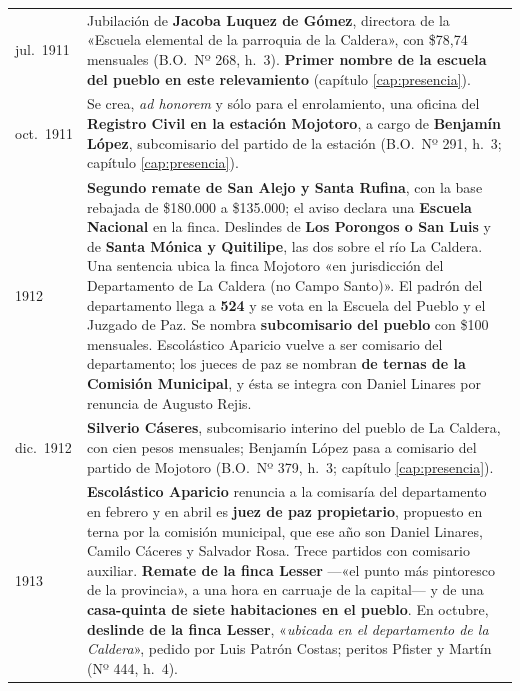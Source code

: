 \begin{longtable}{@{}p{2.7cm}p{10.3cm}@{}}
jul.\ 1911 & Jubilación de \textbf{Jacoba Luquez de Gómez}, directora de la «Escuela elemental de la parroquia de la Caldera», con \$78,74 mensuales (B.O.\ Nº 268, h.\ 3). \textbf{Primer nombre de la escuela del pueblo en este relevamiento} (capítulo \ref{cap:presencia}). \\
oct.\ 1911 & Se crea, \textit{ad honorem} y sólo para el enrolamiento, una oficina del \textbf{Registro Civil en la estación Mojotoro}, a cargo de \textbf{Benjamín López}, subcomisario del partido de la estación (B.O.\ Nº 291, h.\ 3; capítulo \ref{cap:presencia}). \\
1912 & \textbf{Segundo remate de San Alejo y Santa Rufina}, con la base rebajada de \$180.000 a \$135.000; el aviso declara una \textbf{Escuela Nacional} en la finca. Deslindes de \textbf{Los Porongos o San Luis} y de \textbf{Santa Mónica y Quitilipe}, las dos sobre el río La Caldera. Una sentencia ubica la finca Mojotoro «en jurisdicción del Departamento de La Caldera (no Campo Santo)». El padrón del departamento llega a \textbf{524} y se vota en la Escuela del Pueblo y el Juzgado de Paz. Se nombra \textbf{subcomisario del pueblo} con \$100 mensuales. Escolástico Aparicio\index{Aparicio, Escolástico M.} vuelve a ser comisario del departamento; los jueces de paz se nombran \textbf{de ternas de la Comisión Municipal}, y ésta se integra con Daniel Linares\index{Linares, Daniel} por renuncia de Augusto Rejis\index{Regis, Augusto}. \\
dic.\ 1912 & \textbf{Silverio Cáseres}, subcomisario interino del pueblo de La Caldera, con cien pesos mensuales; Benjamín López pasa a comisario del partido de Mojotoro (B.O.\ Nº 379, h.\ 3; capítulo \ref{cap:presencia}). \\
1913 & \textbf{Escolástico Aparicio}\index{Aparicio, Escolástico M.} renuncia a la comisaría del departamento en febrero y en abril es \textbf{juez de paz propietario}, propuesto en terna por la comisión municipal, que ese año son Daniel Linares\index{Linares, Daniel}, Camilo Cáceres y Salvador Rosa\index{Rosa, Salvador}. Trece partidos con comisario auxiliar. \textbf{Remate de la finca Lesser} ---«el punto más pintoresco de la provincia», a una hora en carruaje de la capital--- y de una \textbf{casa-quinta de siete habitaciones en el pueblo}. En octubre, \textbf{deslinde de la finca Lesser}, «\textit{ubicada en el departamento de la Caldera}», pedido por Luis Patrón Costas; peritos Pfister y Martín (Nº 444, h.\ 4). \\

\end{longtable}
